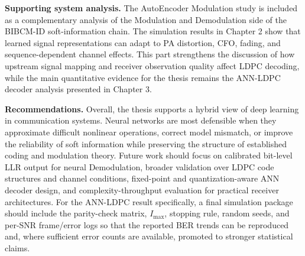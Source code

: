 \noindent\textbf{Supporting system analysis.} The AutoEncoder Modulation study is included as a complementary analysis of the Modulation and Demodulation side of the BIBCM-ID soft-information chain. The simulation results in Chapter 2 show that learned signal representations can adapt to PA distortion, CFO, fading, and sequence-dependent channel effects. This part strengthens the discussion of how upstream signal mapping and receiver observation quality affect LDPC decoding, while the main quantitative evidence for the thesis remains the ANN-LDPC decoder analysis presented in Chapter 3.

\noindent\textbf{Recommendations.} Overall, the thesis supports a hybrid view of deep learning in communication systems. Neural networks are most defensible when they approximate difficult nonlinear operations, correct model mismatch, or improve the reliability of soft information while preserving the structure of established coding and modulation theory. Future work should focus on calibrated bit-level LLR output for neural Demodulation, broader validation over LDPC code structures and channel conditions, fixed-point and quantization-aware ANN decoder design, and complexity-throughput evaluation for practical receiver architectures. For the ANN-LDPC result specifically, a final simulation package should include the parity-check matrix, $I_{\max}$, stopping rule, random seeds, and per-SNR frame/error logs so that the reported BER trends can be reproduced and, where sufficient error counts are available, promoted to stronger statistical claims.
